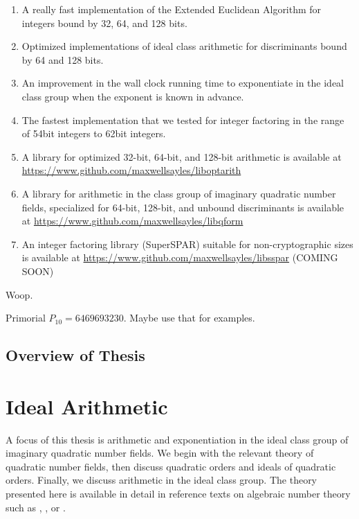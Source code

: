 \documentclass{ucalgthes1}
\theoremstyle{definition}
\begin{document}
\begin{enumerate}
\item A really fast implementation of the Extended Euclidean Algorithm for integers bound by 32, 64, and 128 bits.

\item Optimized implementations of ideal class arithmetic for discriminants bound by 64 and 128 bits.

\item An improvement in the wall clock running time to exponentiate in the ideal class group when the exponent is known in advance.

\item The fastest implementation that we tested for integer factoring in the range of 54bit integers to 62bit integers.

\item A library for optimized 32-bit, 64-bit, and 128-bit arithmetic is available at \url{https://www.github.com/maxwellsayles/liboptarith}

\item A library for arithmetic in the class group of imaginary quadratic number fields, specialized for 64-bit, 128-bit, and unbound discriminants is available at \url{https://www.github.com/maxwellsayles/libqform}

\item An integer factoring library (SuperSPAR) suitable for non-cryptographic sizes is available at \url{https://www.github.com/maxwellsayles/libsspar}  (COMING SOON)

\end{enumerate}

Woop.

Primorial $P_{10} = 6469693230$.  Maybe use that for examples.

\section{Overview of Thesis}



\chapter{Ideal Arithmetic}
\label{chap:idealArithmetic}

A focus of this thesis is arithmetic and exponentiation in the ideal class group of imaginary quadratic number fields.  We begin with the relevant theory of quadratic number fields, then discuss quadratic orders and ideals of quadratic orders.  Finally, we discuss arithmetic in the ideal class group.  The theory presented here is available in detail in reference texts on algebraic number theory such as \cite{Cohn1980}, \cite{Hua2012}, or \cite{Ireland1990}. 
\end{document}
